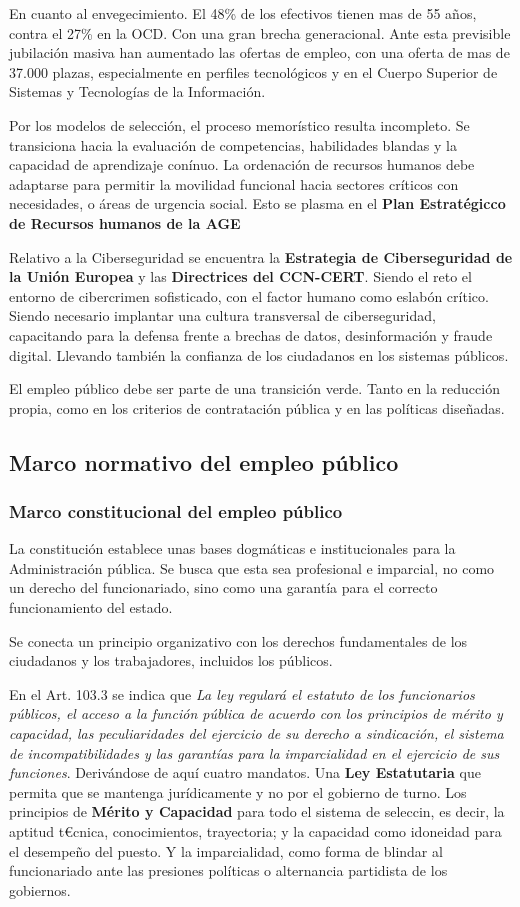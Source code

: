         En cuanto al envegecimiento. El 48\% de los efectivos tienen mas de 55 años, contra el 27\% en la OCD. Con una gran brecha generacional. Ante esta previsible jubilación masiva han aumentado las ofertas de empleo, con una oferta de mas de 37.000 plazas, especialmente en perfiles tecnológicos y en el Cuerpo Superior de Sistemas y Tecnologías de la Información.

        Por los modelos de selección, el proceso memorístico resulta incompleto. Se transiciona hacia la evaluación de competencias, habilidades blandas y la capacidad de aprendizaje conínuo. La ordenación de recursos humanos debe adaptarse para permitir la movilidad funcional hacia sectores críticos con necesidades, o áreas de urgencia social. Esto se plasma en el \textbf{Plan Estratégicco de Recursos humanos de la AGE}

        Relativo a la Ciberseguridad se encuentra la \textbf{Estrategia de Ciberseguridad de la Unión Europea} y las \textbf{Directrices del CCN-CERT}. Siendo el reto el entorno de cibercrimen sofisticado, con el factor humano como eslabón crítico. Siendo necesario implantar una cultura transversal de ciberseguridad, capacitando para la defensa frente a brechas de datos, desinformación y fraude digital. Llevando también la confianza de los ciudadanos en los sistemas públicos.

        El empleo público debe ser parte de una transición verde. Tanto en la reducción propia, como en los criterios de contratación pública y en las políticas diseñadas.


\subsection{Marco normativo del empleo público} %
    \subsubsection{Marco constitucional del empleo público} %
        La constitución establece unas bases dogmáticas e institucionales para la Administración pública. Se busca que esta sea profesional e imparcial, no como un derecho del funcionariado, sino como una garantía para el correcto funcionamiento del estado.

        Se conecta un principio organizativo con los derechos fundamentales de los ciudadanos y los trabajadores, incluidos los públicos.

        En el Art. 103.3 se indica que \textit{La ley regulará el estatuto de los funcionarios públicos, el acceso a la función pública de acuerdo con los principios de mérito y capacidad, las peculiaridades del ejercicio de su derecho a sindicación, el sistema de incompatibilidades y las garantías para la imparcialidad en el ejercicio de sus funciones}. Derivándose de aquí cuatro mandatos. Una \textbf{Ley Estatutaria} que permita que se mantenga jurídicamente y no por el gobierno de turno. Los principios de \textbf{Mérito y Capacidad} para todo el sistema de seleccin, es decir, la aptitud t€cnica, conocimientos, trayectoria; y la capacidad como idoneidad para el desempeño del puesto. Y la imparcialidad, como forma de blindar al funcionariado ante las presiones políticas o alternancia partidista de los gobiernos.

